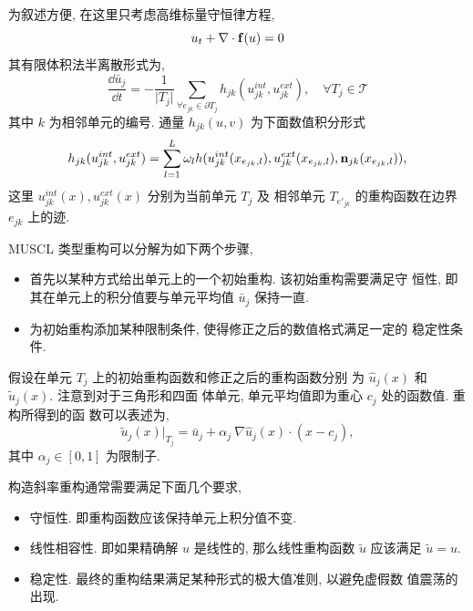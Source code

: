为叙述方便, 在这里只考虑高维标量守恒律方程,
\begin{equation}
  \label{eq:scaler-conservation-law}
  u_{t} + \nabla \cdot {\bf{f}}(u) = 0
\end{equation}
其有限体积法半离散形式为,
\begin{equation}
  \label{eq:scalar-semi-discrect}
  \frac{\dd \bar{u}_{j}}{\dd t} = - \frac{1}{\vert T_{j} \vert}
  \sum_{\forall e_{jk}\in \partial T_{j}}
  h_{jk}(u_{jk}^{int},u_{jk}^{ext}), \quad \forall T_{j} \in \mathcal{T}
\end{equation}
其中 $k$ 为相邻单元的编号. 通量 $h_{jk}(u,v)$ 为下面数值积分形式
\begin{equation}
  \label{eq:flux-each-edge}
  h_{jk}(u_{jk}^{int},u_{jk}^{ext}) = \sum_{l=1}^{L} \omega_{l}
  h(u_{jk}^{int}(x_{e_{jk},l}), u_{jk}^{ext}(x_{e_{jk},l}), {\bf{n}}_{jk}(x_{e_{jk},l})),
\end{equation}
这里 $u_{jk}^{int}(x), u_{jk}^{ext}(x)$ 分别为当前单元 $T_{j}$ 及
相邻单元 $T_{e'_{jk}}$ 的重构函数在边界 $e_{jk}$ 上的迹.

MUSCL 类型重构可以分解为如下两个步骤,
\begin{itemize}
\item 首先以某种方式给出单元上的一个初始重构. 该初始重构需要满足守
  恒性, 即其在单元上的积分值要与单元平均值 $\bar{u}_{j}$ 保持一直.
\item 为初始重构添加某种限制条件, 使得修正之后的数值格式满足一定的
  稳定性条件.
\end{itemize}
假设在单元 $T_{j}$ 上的初始重构函数和修正之后的重构函数分别
为 $\hat{u}_{j}(x)$ 和 $\tilde{u}_{j}(x)$. 注意到对于三角形和四面
体单元, 单元平均值即为重心 ${{c}}_{j}$ 处的函数值. 重构所得到的函
数可以表述为,
\begin{equation}
  \label{eq:unstru-linear-reconstruction}
  \tilde{u}_{j}(x)\vert_{T_{j}} = \bar{u}_{j} + \alpha_{j} ~
  \nabla \hat{u}_{j}(x) \cdot (x - c_{j}),
\end{equation}
其中 $\alpha_{j} \in [0,1]$ 为限制子.

构造斜率重构通常需要满足下面几个要求\cite{Godlewski1996,Buffard2010},
\begin{itemize}
\item 守恒性. 即重构函数应该保持单元上积分值不变.
\item 线性相容性. 即如果精确解 $u$ 是线性的, 那么线性重构函数
  $\tilde{u}$ 应该满足 $\tilde{u}=u$.
\item 稳定性. 最终的重构结果满足某种形式的极大值准则, 以避免虚假数
  值震荡的出现.
\end{itemize}

